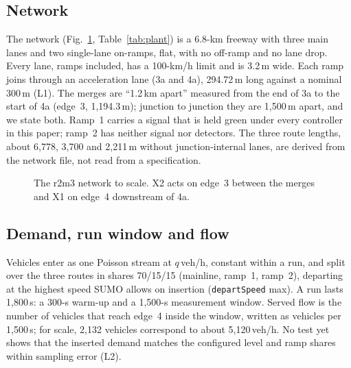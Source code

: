 \subsection{Network}\label{sec:network}

The network (Fig.~\ref{fig:network}, Table~\ref{tab:plant}) is a 6.8-km freeway with three main lanes and two single-lane on-ramps, flat, with no off-ramp and no lane drop.
Every lane, ramps included, has a 100-km/h limit and is 3.2\,m wide.
Each ramp joins through an acceleration lane (3a and 4a), 294.72\,m long against a nominal 300\,m (L1).
The merges are ``1.2\,km apart'' measured from the end of 3a to the start of 4a (edge~3, 1,194.3\,m); junction to junction they are 1,500\,m apart, and we state both.
Ramp~1 carries a signal that is held green under every controller in this paper; ramp~2 has neither signal nor detectors.
The three route lengths, about 6,778, 3,700 and 2,211\,m without junction-internal lanes, are derived from the network file, not read from a specification.

\begin{figure}[tbp]
\centering
{}
\caption{The r2m3 network to scale. X2 acts on edge~3 between the merges and X1 on edge~4 downstream of 4a.}\label{fig:network}
\end{figure}

\begin{table}[tbp]
\centering
{}
\caption{The plant at a glance. Route lengths are derived. The SUMO arguments are those stored with the r1m3 baseline.}\label{tab:plant}
\end{table}

\subsection{Demand, run window and flow}\label{sec:demand}

Vehicles enter as one Poisson stream at $q$\,veh/h, constant within a run, and split over the three routes in shares 70/15/15 (mainline, ramp~1, ramp~2), departing at the highest speed SUMO allows on insertion (\texttt{departSpeed} max).
A run lasts 1,800\,s: a 300-s warm-up and a 1,500-s measurement window.
Served flow is the number of vehicles that reach edge~4 inside the window, written as vehicles per 1,500\,s; for scale, 2,132 vehicles correspond to about 5,120\,veh/h.
No test yet shows that the inserted demand matches the configured level and ramp shares within sampling error (L2).

